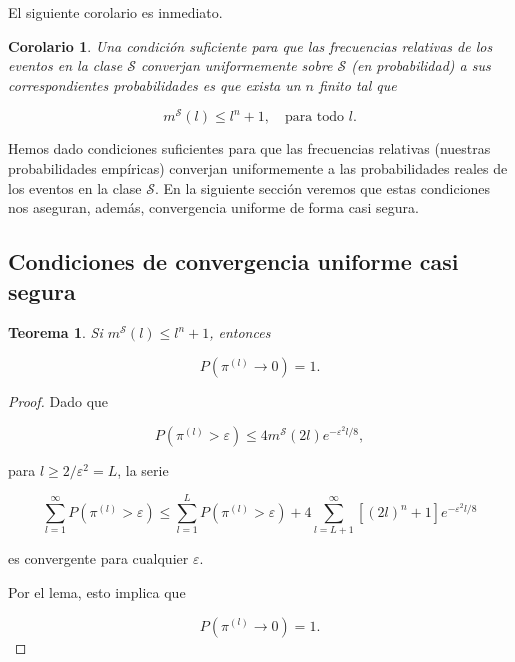 \documentclass{report}
\newtheorem{thm}{Teorema}[section]
\newtheorem{cor}{Corolario}[thm]
\begin{document}
El siguiente corolario es inmediato.\newline

\begin{cor}
Una condición suficiente para que las frecuencias relativas de los eventos en la clase \( \mathcal{S} \) converjan uniformemente sobre \( \mathcal{S} \) (en probabilidad) a sus correspondientes probabilidades es que exista un \( n \) finito tal que  

\[
m^{\mathcal{S}}(l) \leq l^n + 1, \quad \text{para todo } l.
\]
\end{cor}

\bigskip
Hemos dado condiciones suficientes para que las frecuencias relativas (nuestras probabilidades empíricas) converjan uniformemente a las 
probabilidades reales de los eventos en la clase \( \mathcal{S} \). En la siguiente sección veremos que estas condiciones nos aseguran, además, 
convergencia uniforme de forma casi segura.\newline

\subsection{Condiciones de convergencia uniforme casi segura}

\begin{thm}
    Si \( m^{\mathcal{S}}(l) \leq l^n + 1 \), entonces  

    \[
    P(\pi^{(l)} \to 0) = 1.
    \]
    
\end{thm} 

\begin{proof}

Dado que  

\[
P(\pi^{(l)} > \varepsilon) \leq 4 m^{\mathcal{S}}(2l)  e^{-\varepsilon^2 l/8},
\]

para \( l \geq 2 / \varepsilon^2 =L \), la serie  

\[
\sum_{l=1}^{\infty} P(\pi^{(l)} > \varepsilon) \leq \sum_{l=1}^{L} P(\pi^{(l)} > \varepsilon) + 4 \sum_{l=L+1}^{\infty} [(2l)^n + 1] e^{-\varepsilon^2 l/8}
\]

es convergente para cualquier \( \varepsilon \).  

Por el lema, esto implica que  

\[
P(\pi^{(l)} \to 0) = 1.
\]
\end{proof}
\end{document}
